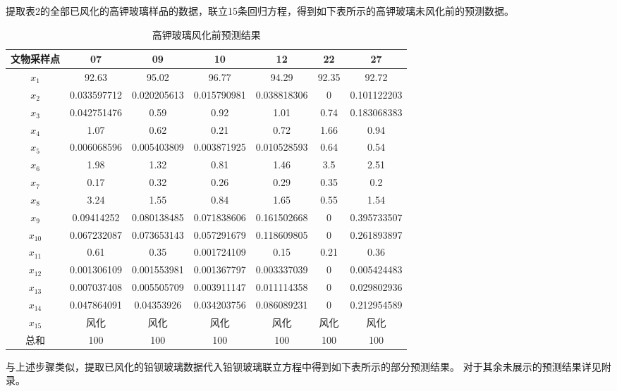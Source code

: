 \documentclass[UTF8]{ctexart}
\begin{document}
提取表2的全部已风化的高钾玻璃样品的数据，联立15条回归方程，得到如下表所示的高钾玻璃未风化前的预测数据。
\begin{table}[H]
    \centering
	\caption{高钾玻璃风化前预测结果}
    \begin{tabular}{|c|c|c|c|c|c|c|}
    \hline
        文物采样点 & 07 & 09 & 10 & 12 & 22 & 27 \\ \hline
        $x_1$ & 92.63 & 95.02 & 96.77 & 94.29 & 92.35 & 92.72 \\ \hline
        $x_2$ & 0.033597712 & 0.020205613 & 0.015790981 & 0.038818306 & 0 & 0.101122203 \\ \hline
        $x_3$ & 0.042751476 & 0.59 & 0.92 & 1.01 & 0.74 & 0.183068383 \\ \hline
        $x_4$ & 1.07 & 0.62 & 0.21 & 0.72 & 1.66 & 0.94 \\ \hline
        $x_5$ & 0.006068596 & 0.005403809 & 0.003871925 & 0.010528593 & 0.64 & 0.54 \\ \hline
        $x_6$ & 1.98 & 1.32 & 0.81 & 1.46 & 3.5 & 2.51 \\ \hline
        $x_7$ & 0.17 & 0.32 & 0.26 & 0.29 & 0.35 & 0.2 \\ \hline
        $x_8$ & 3.24 & 1.55 & 0.84 & 1.65 & 0.55 & 1.54 \\ \hline
        $x_9$ & 0.09414252 & 0.080138485 & 0.071838606 & 0.161502668 & 0 & 0.395733507 \\ \hline
        $x_{10}$ & 0.067232087 & 0.073653143 & 0.057291679 & 0.118609805 & 0 & 0.261893897 \\ \hline
        $x_{11}$ & 0.61 & 0.35 & 0.001724109 & 0.15 & 0.21 & 0.36 \\ \hline
        $x_{12}$ & 0.001306109 & 0.001553981 & 0.001367797 & 0.003337039 & 0 & 0.005424483 \\ \hline
        $x_{13}$ & 0.007037408 & 0.005505709 & 0.003911147 & 0.011114358 & 0 & 0.029802936 \\ \hline
        $x_{14}$ & 0.047864091 & 0.04353926 & 0.034203756 & 0.086089231 & 0 & 0.212954589 \\ \hline
        $x_{15}$ & 风化 & 风化 & 风化 & 风化 & 风化 & 风化 \\ \hline
        总和 & 100 & 100 & 100 & 100 & 100 & 100 \\ \hline
    \end{tabular}
\end{table}

与上述步骤类似，提取已风化的铅钡玻璃数据代入铅钡玻璃联立方程中得到如下表所示的部分预测结果。
对于其余未展示的预测结果详见附录。
\end{document}

